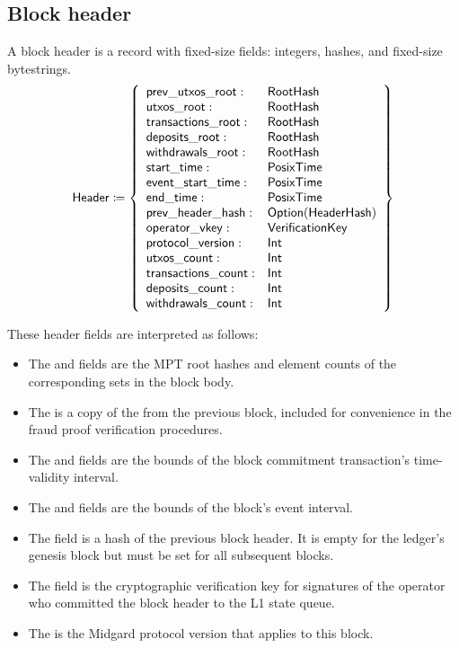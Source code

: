 \documentclass[../midgard.tex]{subfiles}
\begin{document}
\subsection{Block header}
\label{h:block-header}

A block header is a record with fixed-size fields: integers, hashes, and fixed-size bytestrings.
\begin{equation*}
    \mathsf{Header} \coloneq \left\{
    \begin{array}{ll}
        \mathsf{prev\_utxos\_root} : & \mathsf{RootHash} \\
        \mathsf{utxos\_root} : & \mathsf{RootHash} \\
        \mathsf{transactions\_root} : & \mathsf{RootHash} \\
        \mathsf{deposits\_root} : & \mathsf{RootHash} \\
        \mathsf{withdrawals\_root} : & \mathsf{RootHash} \\
        \mathsf{start\_time} : & \mathsf{PosixTime} \\
        \mathsf{event\_start\_time} : & \mathsf{PosixTime} \\
        \mathsf{end\_time} : & \mathsf{PosixTime} \\
        \mathsf{prev\_header\_hash} : & \mathsf{Option(HeaderHash)} \\
        \mathsf{operator\_vkey} : & \mathsf{VerificationKey} \\
        \mathsf{protocol\_version} : & \mathsf{Int} \\
        \mathsf{utxos\_count} : & \mathsf{Int} \\
        \mathsf{transactions\_count} : & \mathsf{Int} \\
        \mathsf{deposits\_count} : & \mathsf{Int} \\
        \mathsf{withdrawals\_count} : & \mathsf{Int}
    \end{array} \right\}
\end{equation*}

These header fields are interpreted as follows:
\begin{itemize}
    \item The  and  fields are the MPT root hashes and element counts of the corresponding sets in the block body.
    \item The  is a copy of the  from the previous block, included for convenience in the fraud proof verification procedures.
    \item The  and  fields are the bounds of the block commitment transaction's time-validity interval.
    \item The  and  fields are the bounds of the block's event interval.
    \item The  field is a hash of the previous block header.
      It is empty for the ledger's genesis block but must be set for all subsequent blocks.
    \item The  field is the cryptographic verification key for signatures of the operator who committed the block header to the L1 state queue.
    \item The  is the Midgard protocol version that applies to this block.
\end{itemize}
\end{document}
